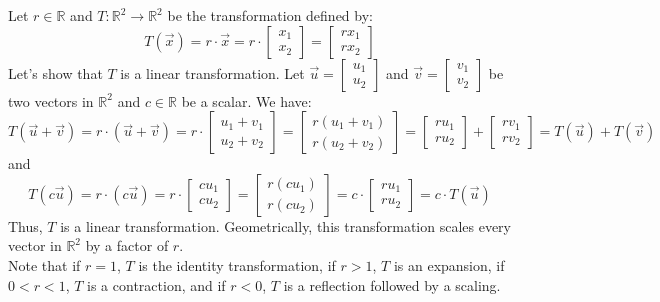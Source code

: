 \begin{eg}
    Let $r \in \mathbb{R}$ and $T: \mathbb{R}^2 \to \mathbb{R}^2$ be the transformation defined by:
    \[
        T(\vec{x}) = r \cdot \vec{x} = r \cdot \begin{bmatrix} x_1 \\ x_2 \end{bmatrix} = \begin{bmatrix} r x_1 \\ r x_2 \end{bmatrix}
    \]
    Let's show that $T$ is a linear transformation. Let $\vec{u} = \begin{bmatrix} u_1 \\ u_2 \end{bmatrix}$ and $\vec{v} = \begin{bmatrix} v_1 \\ v_2 \end{bmatrix}$ be two vectors in $\mathbb{R}^2$ and $c \in \mathbb{R}$ be a scalar. We have:
    \[
        T(\vec{u} + \vec{v}) = r \cdot (\vec{u} + \vec{v}) = r \cdot \begin{bmatrix} u_1 + v_1 \\ u_2 + v_2 \end{bmatrix} = \begin{bmatrix} r(u_1 + v_1) \\ r(u_2 + v_2) \end{bmatrix} = \begin{bmatrix} r u_1 \\ r u_2 \end{bmatrix} + \begin{bmatrix} r v_1 \\ r v_2 \end{bmatrix} = T(\vec{u}) + T(\vec{v})
    \]
    and
    \[
        T(c \vec{u}) = r \cdot (c \vec{u}) = r \cdot \begin{bmatrix} c u_1 \\ c u_2 \end{bmatrix} = \begin{bmatrix} r(c u_1) \\ r(c u_2) \end{bmatrix} = c \cdot \begin{bmatrix} r u_1 \\ r u_2 \end{bmatrix} = c \cdot T(\vec{u})
    \]
    Thus, $T$ is a linear transformation. Geometrically, this transformation scales every vector in $\mathbb{R}^2$ by a factor of $r$. \\
    Note that if $r = 1$, $T$ is the identity transformation, if $r > 1$, $T$ is an expansion, if $0 < r < 1$, $T$ is a contraction, and if $r < 0$, $T$ is a reflection followed by a scaling.
\end{eg}


